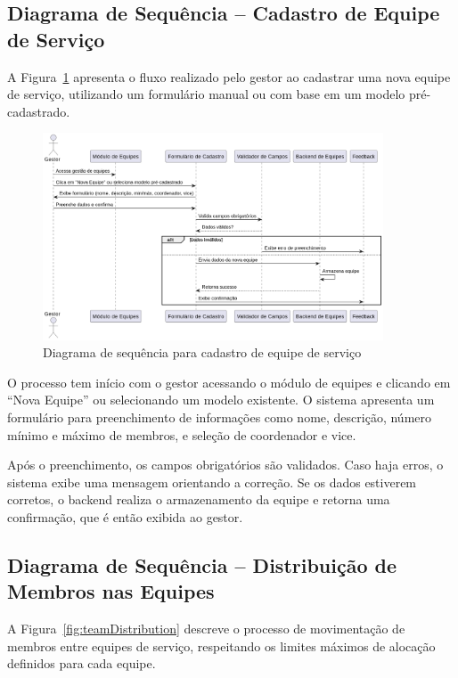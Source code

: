\subsection{Diagrama de Sequência – Cadastro de Equipe de Serviço}

A Figura~\ref{fig:teamCreate} apresenta o fluxo realizado pelo gestor ao cadastrar uma nova equipe de serviço, utilizando um formulário manual ou com base em um modelo pré-cadastrado.

\begin{figure}[H]
    \centering
    \includegraphics[width=0.9\textwidth]{images/diagramasdesequencias/teamCreate.png}
    \caption{Diagrama de sequência para cadastro de equipe de serviço}
    \label{fig:teamCreate}
\end{figure}

O processo tem início com o gestor acessando o módulo de equipes e clicando em “Nova Equipe” ou selecionando um modelo existente. O sistema apresenta um formulário para preenchimento de informações como nome, descrição, número mínimo e máximo de membros, e seleção de coordenador e vice.

Após o preenchimento, os campos obrigatórios são validados. Caso haja erros, o sistema exibe uma mensagem orientando a correção. Se os dados estiverem corretos, o backend realiza o armazenamento da equipe e retorna uma confirmação, que é então exibida ao gestor.

\subsection{Diagrama de Sequência – Distribuição de Membros nas Equipes}

A Figura~\ref{fig:teamDistribution} descreve o processo de movimentação de membros entre equipes de serviço, respeitando os limites máximos de alocação definidos para cada equipe.

